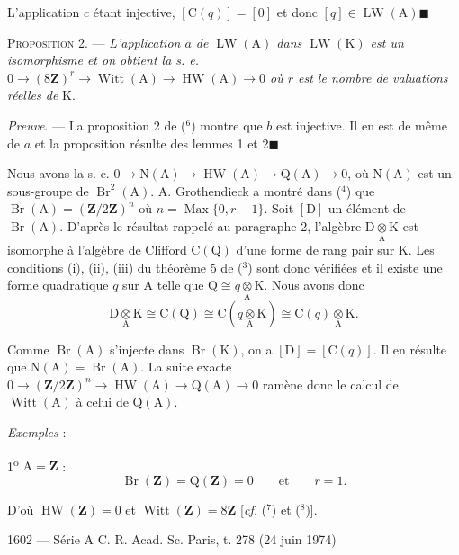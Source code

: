 L'application $c$ étant injective, $[\mathrm C(q)]=[0]$ et donc $[q]\in\operatorname{LW}(\mathrm A)$\quad$\blacksquare$

\textsc{Proposition 2}. — \emph{L'application $a$ de $\operatorname{LW}(\mathrm A)$ dans $\operatorname{LW}(\mathrm K)$ est un isomorphisme et on
obtient la s. e. $0\to(8\mathbf Z)^r\to\operatorname{Witt}(\mathrm A)\to\operatorname{HW}(\mathrm A)\to0$ où $r$ est le nombre de valuations
réelles de} K.

\emph{Preuve}. — La proposition 2 de (${}^6$) montre que $b$ est injective. Il en est de même de $a$
et la proposition résulte des lemmes 1 et 2\quad$\blacksquare$

Nous avons la s. e. $0\to\mathrm N(\mathrm A)\to\operatorname{HW}(\mathrm A)\to\mathrm Q(\mathrm A)\to0$, où $\mathrm N(\mathrm A)$ est un sous-groupe
de $\operatorname{Br}^2(\mathrm A)$. A. Grothendieck a montré dans (${}^4$) que $\operatorname{Br}(\mathrm A)=(\mathbf Z/2\mathbf Z)^n$ où
$n=\operatorname{Max}\{0,r-1\}$. Soit $[\mathrm D]$ un élément de $\operatorname{Br}(\mathrm A)$. D'après le résultat rappelé au
paragraphe 2, l'algèbre $\mathrm D\underset{\mathrm A}{\otimes}\mathrm K$ est isomorphe à l'algèbre de Clifford $\mathrm C(\mathrm Q)$ d'une forme
de rang pair sur K. Les conditions (i), (ii), (iii) du théorème 5 de (${}^3$) sont donc vérifiées
et il existe une forme quadratique $q$ sur A telle que $\mathrm Q\cong q\underset{\mathrm A}{\otimes}\mathrm K$. Nous avons donc
\[
\mathrm D\underset{\mathrm A}{\otimes}\mathrm K\cong\mathrm C(\mathrm Q)\cong\mathrm C(q\underset{\mathrm A}{\otimes}\mathrm K)\cong\mathrm C(q)\underset{\mathrm A}{\otimes}\mathrm K.
\]

Comme $\operatorname{Br}(\mathrm A)$ s'injecte dans $\operatorname{Br}(\mathrm K)$, on a $[\mathrm D]=[\mathrm C(q)]$. Il en résulte que $\mathrm N(\mathrm A)=\operatorname{Br}(\mathrm A)$.
La suite exacte $0\to(\mathbf Z/2\mathbf Z)^n\to\operatorname{HW}(\mathrm A)\to\mathrm Q(\mathrm A)\to0$ ramène donc le calcul de $\operatorname{Witt}(\mathrm A)$
à celui de $\mathrm Q(\mathrm A)$.

\emph{Exemples} :

1\textsuperscript{o} $\mathrm A=\mathbf Z$ :
\[
\operatorname{Br}(\mathbf Z)=\mathrm Q(\mathbf Z)=0\qquad\text{et}\qquad r=1.
\]

D'où $\operatorname{HW}(\mathbf Z)=0$ et $\operatorname{Witt}(\mathbf Z)=8\mathbf Z$ [\emph{cf.} (${}^7$) et (${}^8$)].

1602 --- Série A \hfill C. R. Acad. Sc. Paris, t. 278 (24 juin 1974)

